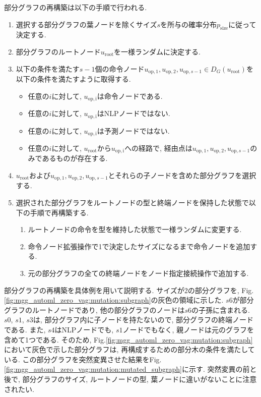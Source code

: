 \documentclass[11pt,oneside,openany,report]{jsbook}
\begin{document}
部分グラフの再構築は以下の手順で行われる.

\begin{enumerate}
  \item 選択する部分グラフの葉ノードを除くサイズ$s$を所与の確率分布$p_\mathrm{size}$に従って決定する.
  \item 部分グラフのルートノード$u_\mathrm{root}$を一様ランダムに決定する.
  \item 以下の条件を満たす$s-1$個の命令ノード$ u_\mathrm{op,1},u_\mathrm{op,2},u_{\mathrm{op},s-1} \in D_G(u_\mathrm{root})$を以下の条件を満たすように取得する.
  \begin{itemize}
    \item 任意の$ i $に対して, $u_\mathrm{op,i}$は命令ノードである.
    \item 任意の$ i $に対して, $u_\mathrm{op,i}$はNLPノードではない.
    \item 任意の$ i $に対して, $u_\mathrm{op,i}$は予測ノードではない.
    \item 任意の$ i $に対して, $u_\mathrm{root}$から$u_\mathrm{op,i}$への経路で, 経由点は$ u_\mathrm{op,1},u_\mathrm{op,2},u_{\mathrm{op},s-1}$のみであるものが存在する.
  \end{itemize}
  \item $u_\mathrm{root}$および$ u_\mathrm{op,1},u_\mathrm{op,2},u_{\mathrm{op},s-1}$とそれらの子ノードを含めた部分グラフを選択する.
  \item 選択された部分グラフをルートノードの型と終端ノードを保持した状態で以下の手順で再構築する.
  \begin{enumerate}
    \item ルートノードの命令を型を維持した状態で一様ランダムに変更する.
    \item 命令ノード拡張操作で1で決定したサイズになるまで命令ノードを追加する.
    \item 元の部分グラフの全ての終端ノードをノード指定接続操作で追加する.
  \end{enumerate}
\end{enumerate}

部分グラフの再構築を具体例を用いて説明する. サイズが2の部分グラフを, Fig.\ref{fig:mgg_automl_zero_vag:mutation:subgraph}の灰色の領域に示した. $s6$が部分グラフのルートノードであり, 他の部分グラフのノードは$s6$の子孫に含まれる. $s0$, $s1$, $s3$は, 部分グラフ内に子ノードを持たないので, 部分グラフの終端ノードである. また, $s4$はNLPノードでも, $s1$ノードでもなく, 親ノードは元のグラフを含めて1つである. そのため, Fig.\ref{fig:mgg_automl_zero_vag:mutation:subgraph}において灰色で示した部分グラフは, 再構成するための部分木の条件を満たしている. この部分グラフを突然変異させた結果をFig.\ref{fig:mgg_automl_zero_vag:mutation:mutated_subgraph}に示す. 突然変異の前と後で, 部分グラフのサイズ, ルートノードの型, 葉ノードに違いがないことに注意されたい.
\end{document}
